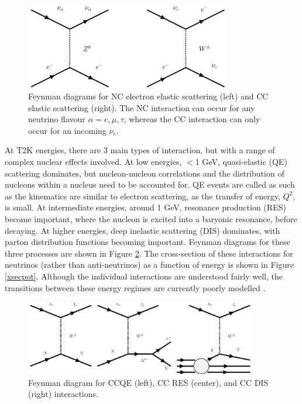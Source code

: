 \begin{figure}[!htbp]
\vspace{20pt}
\centering
\includegraphics*[width=0.8\textwidth,clip]{figs/feynmanScatt}
\caption{Feynman diagrams for NC electron elastic scattering (left) and CC elastic scattering (right). The NC interaction can occur for any neutrino flavour $\alpha = e, \mu, \tau$, whereas the CC interaction can only occur for an incoming $\nu_{e}$.} \label{Scattdiagram}
\end{figure}

At T2K energies, there are 3 main types of interaction, but with a range of complex nuclear effects involved. At low energies, $<$1 GeV, quasi-elastic (QE) scattering dominates, but nucleon-nucleon correlations and the distribution of nucleons within a nucleus need to be accounted for. QE events are called as such as the kinematics are similar to electron scattering, as the transfer of energy, $Q^2$, is small. At intermediate energies, around 1 GeV, resonance production (RES) become important, where the nucleon is excited into a baryonic resonance, before decaying. At higher energies, deep inelastic scattering (DIS) dominates, with parton distribution functions becoming important. Feynman diagrams for these three processes are shown in Figure \ref{feynmandiagrams}. The cross-section of these interactions for neutrinos (rather than anti-neutrinos) as a function of energy is shown in Figure \ref{xsecpot}. Although the individual interactions are understood fairly well, the transitions between these energy regimes are currently poorly modelled \cite{models}.

\begin{figure}[!htbp]
\vspace{20pt}
\centering
\includegraphics*[width=0.9\textwidth,clip]{figs/feynmanCCs}
\caption{Feynman diagram for CCQE (left), CC RES (center), and CC DIS (right) interactions.
} \label{feynmandiagrams}
\end{figure}


